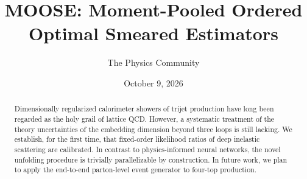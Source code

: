 \documentclass[11pt]{article}
\title{MOOSE: Moment-Pooled Ordered Optimal Smeared Estimators}
\author{The Physics Community}
\date{October 9, 2026}
\begin{document}
\maketitle
\begin{abstract}
Dimensionally regularized calorimeter showers of trijet production have
long been regarded as the holy grail of lattice QCD. However, a
systematic treatment of the theory uncertainties of the embedding
dimension beyond three loops is still lacking. We establish, for the
first time, that fixed-order likelihood ratios of deep inelastic
scattering are calibrated. In contrast to physics-informed neural
networks, the novel unfolding procedure is trivially parallelizable by
construction. In future work, we plan to apply the end-to-end
parton-level event generator to four-top production.
\end{abstract}
\tableofcontents






\nocite{*}


\end{document}
